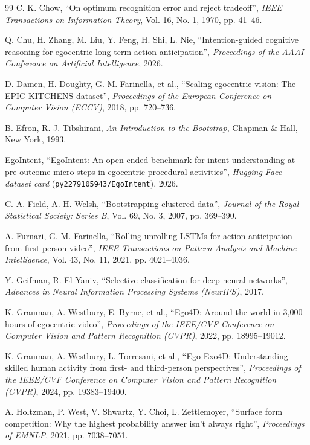\documentclass[a4paper,oneside]{report}
\begin{document}
{\begin{thebibliography}{99}
C. K. Chow, ``On optimum recognition error and reject tradeoff'', \emph{IEEE Transactions on Information Theory}, Vol. 16, No. 1, 1970, pp. 41--46.

Q. Chu, H. Zhang, M. Liu, Y. Feng, H. Shi, L. Nie, ``Intention-guided cognitive reasoning for egocentric long-term action anticipation'', \emph{Proceedings of the AAAI Conference on Artificial Intelligence}, 2026.

D. Damen, H. Doughty, G. M. Farinella, et al., ``Scaling egocentric vision: The EPIC-KITCHENS dataset'', \emph{Proceedings of the European Conference on Computer Vision (ECCV)}, 2018, pp. 720--736.

B. Efron, R. J. Tibshirani, \emph{An Introduction to the Bootstrap}, Chapman \& Hall, New York, 1993.

EgoIntent, ``EgoIntent: An open-ended benchmark for intent understanding at pre-outcome micro-steps in egocentric procedural activities'', \emph{Hugging Face dataset card} (\texttt{py2279105943/EgoIntent}), 2026.

C. A. Field, A. H. Welsh, ``Bootstrapping clustered data'', \emph{Journal of the Royal Statistical Society: Series B}, Vol. 69, No. 3, 2007, pp. 369--390.

A. Furnari, G. M. Farinella, ``Rolling-unrolling LSTMs for action anticipation from first-person video'', \emph{IEEE Transactions on Pattern Analysis and Machine Intelligence}, Vol. 43, No. 11, 2021, pp. 4021--4036.

Y. Geifman, R. El-Yaniv, ``Selective classification for deep neural networks'', \emph{Advances in Neural Information Processing Systems (NeurIPS)}, 2017.

K. Grauman, A. Westbury, E. Byrne, et al., ``Ego4D: Around the world in 3,000 hours of egocentric video'', \emph{Proceedings of the IEEE/CVF Conference on Computer Vision and Pattern Recognition (CVPR)}, 2022, pp. 18995--19012.

K. Grauman, A. Westbury, L. Torresani, et al., ``Ego-Exo4D: Understanding skilled human activity from first- and third-person perspectives'', \emph{Proceedings of the IEEE/CVF Conference on Computer Vision and Pattern Recognition (CVPR)}, 2024, pp. 19383--19400.

A. Holtzman, P. West, V. Shwartz, Y. Choi, L. Zettlemoyer, ``Surface form competition: Why the highest probability answer isn't always right'', \emph{Proceedings of EMNLP}, 2021, pp. 7038--7051.


\end{thebibliography}}
\end{document}
